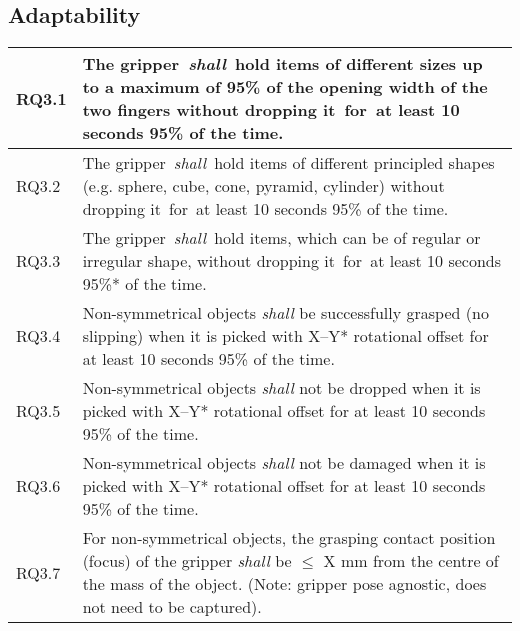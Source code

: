 \documentclass[lettersize,journal]{IEEEtran}
\begin{document}
\subsection{Adaptability} \label{adaptability}
\begin{center}
	\begin{tabular}{|p{7mm}|p{72mm}|}
		\hline
RQ3.1 & The gripper \emph{shall} hold items of different sizes up to a maximum of 95\% of the opening width of the two fingers without dropping it for at least 10 seconds 95\% of the time. \\
\hline
RQ3.2 & The gripper \emph{shall} hold items of different principled shapes (e.g. sphere, cube, cone, pyramid, cylinder) without dropping it for at least 10 seconds 95\% of the time. \\
\hline
RQ3.3 & The gripper \emph{shall} hold items, which can be of regular or irregular shape, without dropping it for at least 10 seconds 95\%* of the time. \\ 
\hline
RQ3.4 & Non-symmetrical objects \emph{shall} be successfully grasped (no slipping) when it is picked with X–Y* rotational offset for at least 10 seconds 95\% of the time.  \\ 
\hline
RQ3.5 & Non-symmetrical objects \emph{shall} not be dropped when it is picked with X–Y* rotational offset for at least 10 seconds 95\% of the time.\\
\hline
RQ3.6 & Non-symmetrical objects \emph{shall} not be damaged when it is picked with X–Y* rotational offset for at least 10 seconds 95\% of the time.\\
\hline
RQ3.7 & For non-symmetrical objects, the grasping contact position (focus) of the gripper \emph{shall} be $\le$ X mm from the centre of the mass of the object. (Note: gripper pose agnostic, does not need to be captured).\\	[1ex] 
\hline
	\end{tabular}
\end{center}
\end{document}
